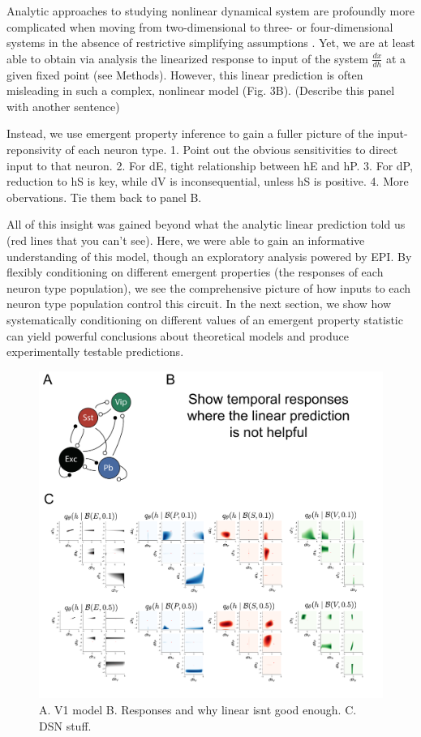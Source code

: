 \documentclass[11pt]{article}
\begin{document}
Analytic approaches to studying nonlinear dynamical system are profoundly more complicated when moving from two-dimensional to three- or four-dimensional systems in the absence of restrictive simplifying assumptions \cite{strogatz1994nonlinear}. 
Yet, we are at least able to obtain via analysis the linearized response to input of the system $\frac{dx}{dh}$ at a given fixed point (see Methods).  
However, this linear prediction is often misleading in such a complex, nonlinear model (Fig. 3B). (Describe this panel with another sentence)

Instead, we use emergent property inference to gain a fuller picture of the input-reponsivity of each neuron type.  1. Point out the obvious sensitivities to direct input to that neuron.  2. For dE, tight relationship between hE and hP.  3. For dP, reduction to hS is key, while dV is inconsequential, unless hS is positive.  4. More obervations.  Tie them back to panel B.  

All of this insight was gained beyond what the analytic linear prediction told us (red lines that you can't see).  
Here, we were able to gain an informative understanding of this model, though an exploratory analysis powered by EPI.  
By flexibly conditioning on different emergent properties (the responses of each neuron type population), we see the comprehensive picture of how inputs to each neuron type population control this circuit.
In the next section, we show how systematically conditioning on different values of an emergent property statistic can yield powerful conclusions about theoretical models and produce experimentally testable predictions.

\begin{figure}
\begin{center}
\includegraphics[scale=0.4]{figs/fig3/fig3.pdf}
\end{center}
\caption{A. V1 model B. Responses and why linear isnt good enough. C. DSN stuff.}
\end{figure}
\end{document}
